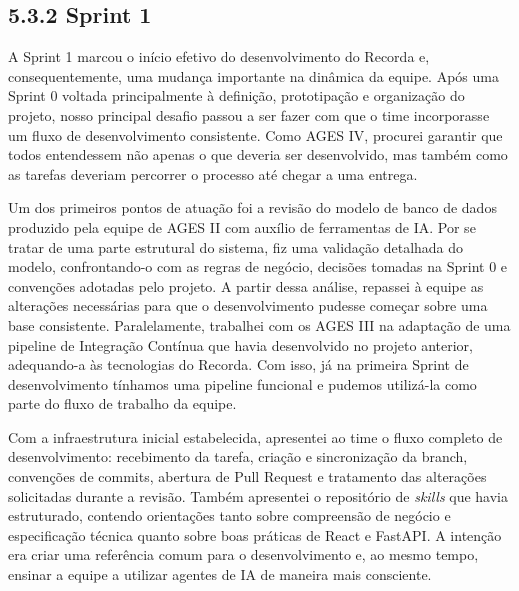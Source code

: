 \hypertarget{__RefHeading___Toc4847_3118176633}{}
\subsection*{5.3.2 Sprint 1}
\label{ages-iv:text-h-0117}

\indent A Sprint 1 marcou o início efetivo do desenvolvimento do Recorda e, consequentemente, uma mudança importante na dinâmica da equipe. Após uma Sprint 0 voltada principalmente à definição, prototipação e organização do projeto, nosso principal desafio passou a ser fazer com que o time incorporasse um fluxo de desenvolvimento consistente. Como AGES IV, procurei garantir que todos entendessem não apenas o que deveria ser desenvolvido, mas também como as tarefas deveriam percorrer o processo até chegar a uma entrega.\par

\indent Um dos primeiros pontos de atuação foi a revisão do modelo de banco de dados produzido pela equipe de AGES II com auxílio de ferramentas de IA. Por se tratar de uma parte estrutural do sistema, fiz uma validação detalhada do modelo, confrontando-o com as regras de negócio, decisões tomadas na Sprint 0 e convenções adotadas pelo projeto. A partir dessa análise, repassei à equipe as alterações necessárias para que o desenvolvimento pudesse começar sobre uma base consistente. Paralelamente, trabalhei com os AGES III na adaptação de uma pipeline de Integração Contínua que havia desenvolvido no projeto anterior, adequando-a às tecnologias do Recorda. Com isso, já na primeira Sprint de desenvolvimento tínhamos uma pipeline funcional e pudemos utilizá-la como parte do fluxo de trabalho da equipe.\par

\indent Com a infraestrutura inicial estabelecida, apresentei ao time o fluxo completo de desenvolvimento: recebimento da tarefa, criação e sincronização da branch, convenções de commits, abertura de Pull Request e tratamento das alterações solicitadas durante a revisão. Também apresentei o repositório de \textit{skills} que havia estruturado, contendo orientações tanto sobre compreensão de negócio e especificação técnica quanto sobre boas práticas de React e FastAPI. A intenção era criar uma referência comum para o desenvolvimento e, ao mesmo tempo, ensinar a equipe a utilizar agentes de IA de maneira mais consciente.\par

